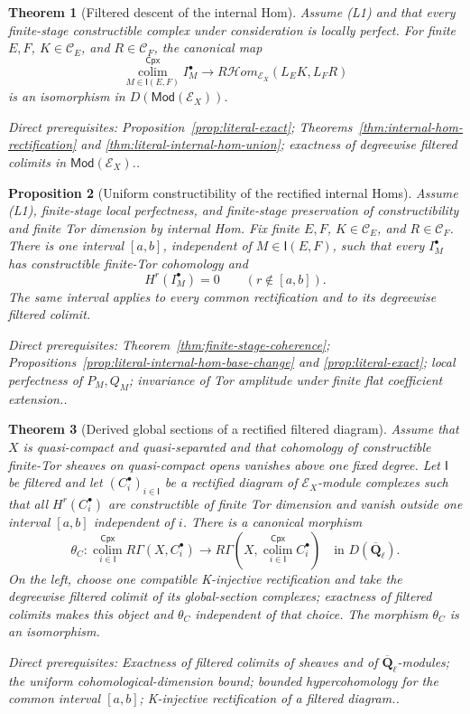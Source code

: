 \documentclass[10pt]{article}
\newtheorem{theorem}{Theorem}[section]
\newtheorem{proposition}[theorem]{Proposition}
\theoremstyle{definition}
\newcommand{\Qlb}{\overline{\mathbf Q}_\ell}
\newcommand{\depends}[1]{\par\smallskip\noindent\textit{Direct prerequisites:} #1.}
\begin{document}
\begin{theorem}[Filtered descent of the internal Hom]
\label{thm:literal-internal-hom-descent}
Assume (L1) and that every finite-stage constructible complex under
consideration is locally perfect.  For finite $E,F$,
$K\in\mathcal C_E$, and $R\in\mathcal C_F$, the canonical map
\[
 \operatorname*{colim}^{\mathsf{Cpx}}_{M\in\mathsf I(E,F)}I_M^\bullet
 \longrightarrow
 R\mathcal Hom_{\mathcal E_X}(L_EK,L_FR)
\]
is an isomorphism in $D(\mathsf{Mod}(\mathcal E_X))$.
\depends{Proposition~\ref{prop:literal-exact};
Theorems~\ref{thm:internal-hom-rectification} and
\ref{thm:literal-internal-hom-union}; exactness of degreewise filtered
colimits in $\mathsf{Mod}(\mathcal E_X)$.}
\end{theorem}

\begin{proposition}[Uniform constructibility of the rectified internal Homs]
\label{prop:rectified-internal-hom-uniform}
Assume (L1), finite-stage local perfectness, and finite-stage preservation
of constructibility and finite Tor dimension by internal Hom.  Fix finite
$E,F$, $K\in\mathcal C_E$, and $R\in\mathcal C_F$.  There is one interval
$[a,b]$, independent of $M\in\mathsf I(E,F)$, such that every
$I_M^\bullet$ has constructible finite-Tor cohomology and
\[
 H^r(I_M^\bullet)=0\qquad(r\notin[a,b]).
\]
The same interval applies to every common rectification and to its
degreewise filtered colimit.
\depends{Theorem~\ref{thm:finite-stage-coherence};
Propositions~\ref{prop:literal-internal-hom-base-change} and
\ref{prop:literal-exact}; local perfectness of $P_M,Q_M$; invariance of Tor
amplitude under finite flat coefficient extension.}
\end{proposition}

\begin{theorem}[Derived global sections of a rectified filtered diagram]
\label{thm:rgamma-filtered}
Assume that $X$ is quasi-compact and quasi-separated and that cohomology
of constructible finite-Tor sheaves on quasi-compact opens vanishes above
one fixed degree.  Let $\mathsf I$ be filtered and let
$(C_i^\bullet)_{i\in\mathsf I}$ be a rectified diagram of
$\mathcal E_X$-module complexes such that all $H^r(C_i^\bullet)$ are
constructible of finite Tor dimension and vanish outside one interval
$[a,b]$ independent of $i$.  There is a canonical morphism
\[
 \theta_C:
 \operatorname*{colim}^{\mathsf{Cpx}}_{i\in\mathsf I}
 R\Gamma(X,C_i^\bullet)
 \longrightarrow
 R\Gamma\!\left(X,
   \operatorname*{colim}^{\mathsf{Cpx}}_{i\in\mathsf I}C_i^\bullet
 \right)
 \quad\text{in }D(\Qlb).
\]
On the left, choose one compatible K-injective rectification and take the
degreewise filtered colimit of its global-section complexes; exactness of
filtered colimits makes this object and $\theta_C$ independent of that
choice.  The morphism $\theta_C$ is an isomorphism.
\depends{Exactness of filtered colimits of sheaves and of $\Qlb$-modules;
the uniform cohomological-dimension bound; bounded hypercohomology for the
common interval $[a,b]$; K-injective rectification of a filtered diagram.}
\end{theorem}
\end{document}
